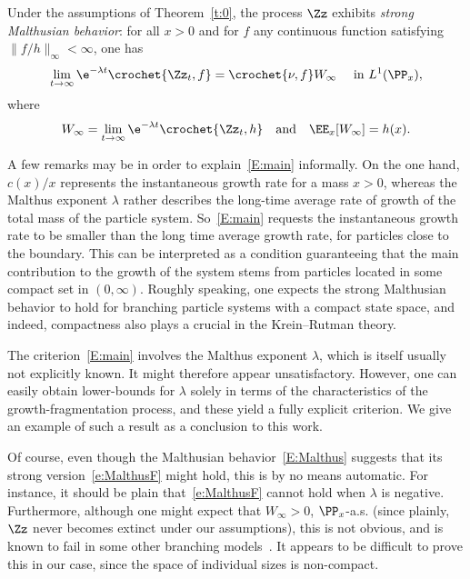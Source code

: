 \begin{theo}\label{t:main}
Under the assumptions of Theorem~\ref{t:0}, the process $\Zz$ exhibits \emph{strong Malthusian behavior}: for all $x>0$ and for $f$ any continuous function satisfying $\lVert f/h \rVert_{\infty}<\infty$, one has
\goodbreak
\begin{equation}\label{e:MalthusF}
\lim_{t\to \infty} \e^{-\lambda t} \crochet{ \Zz_t,f}= \crochet{\nu,f} W_{\infty} \quad \text{ in }L^1(\PP_x),
\end{equation}
where
\[
W_\infty=\lim_{t\to \infty} \e^{-\lambda t} \crochet{ \Zz_t,h} \quad\text{and} \quad \EE_x[W_{\infty}]=h(x).
\]
\end{theo}

A few remarks may be in order to explain~\eqref{E:main} informally. On the one hand, $c(x)/x$ represents the instantaneous growth rate for a mass $x>0$, whereas the Malthus exponent $\lambda$ rather describes the long-time average rate of growth of the total mass of the particle system. So~\eqref{E:main} requests the instantaneous growth rate to be smaller than the long time average growth rate, for particles close to the boundary. This can be interpreted as a condition guaranteeing that the main contribution to the growth of the system stems from particles located in some compact set in $(0,\infty)$. Roughly speaking, one expects the strong Malthusian behavior to hold for branching particle systems with a compact state space, and indeed, compactness also plays a crucial in the Krein--Rutman theory.

The criterion~\eqref{E:main} involves the Malthus exponent $\lambda$, which is itself usually not explicitly known. It might therefore appear unsatisfactory. However, one can easily obtain lower-bounds for $\lambda$ solely in terms of the characteristics of the growth-fragmentation process, and these yield a fully explicit criterion. We give an example of such a result as a conclusion to this work.

Of course, even though the Malthusian behavior~\eqref{E:Malthus} suggests that its strong version~\eqref{e:MalthusF} might hold, this is by no means automatic. For instance, it should be plain that~\eqref{e:MalthusF} cannot hold when $\lambda$ is negative. Furthermore, although one might expect that $W_\infty > 0$, $\PP_x$-a.s. (since plainly, $\Zz$ never becomes extinct under our assumptions), this is not obvious, and is known to fail in some other branching models~\cite{DB-bpre}. It appears to be difficult to prove this in our case, since the space of individual sizes is non-compact.

